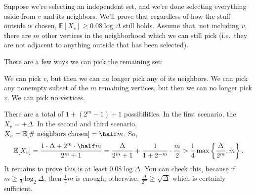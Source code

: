 \documentclass[11pt]{scrartcl}
\newcommand\EE{\mathbb E}
\begin{document}
Suppose we're selecting an independent set, and we're done selecting everything aside from $v$ and its neighbors.
We'll prove that regardless of how the stuff outside is chosen, $\EE[X_v] \ge 0.08 \log \Delta$ still holds.
Assume that, not including $v$, there are $m$ other vertices in the neighborhood which we can still pick (i.e.\ they
are not adjacent to anything outside that has been selected).

There are a few ways we can pick the remaining set:
\begin{itemize}
  \ii We can pick $v$, but then we can no longer pick any of its neighbors.
  \ii We can pick any nonempty subset of the $m$ remaining vertices, but then we can no longer pick $v$.
  \ii We can pick no vertices.
\end{itemize}
There are a total of $1 + \left( 2^m-1 \right) + 1$ possibilities.
In the first scenario, the $X_v = +\Delta$.
In the second and third scenario, $X_v = \EE[\text{\# neighbors chosen}] = \half m$.
So,
\[ \EE[X_v] = \frac{1 \cdot \Delta + 2^m \cdot \half m}{2^m+1}
  = \frac{\Delta}{2^m+1} + \frac{1}{1+2^{-m}} \cdot \frac{m}{2}
  > \frac14 \max \left\{ \frac{\Delta}{2^m}, m \right\}. \]
It remains to prove this is at least $0.08 \log \Delta$.
You can check this, because if $m \ge \frac 12 \log_2 \Delta$, then $\frac 14m$ is enough;
otherwise, $\frac{\Delta}{2^m} \ge \sqrt\Delta$ which is certainly sufficient.
\end{document}

